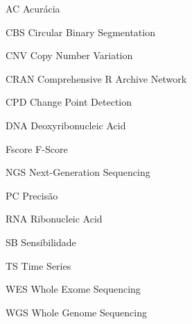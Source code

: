 
\begin{siglas}
    \item[AC] Acurácia
    \item[CBS] Circular Binary Segmentation
    \item[CNV] Copy Number Variation
    \item[CRAN] Comprehensive R Archive Network
    \item[CPD] Change Point Detection
    \item[DNA] Deoxyribonucleic Acid
    \item[Fscore] F-Score
    \item[NGS] Next-Generation Sequencing
    \item[PC] Precisão
    \item[RNA] Ribonucleic Acid
    \item[SB] Sensibilidade
    \item[TS] Time Series
    \item[WES] Whole Exome Sequencing
    \item[WGS] Whole Genome Sequencing
\end{siglas}


